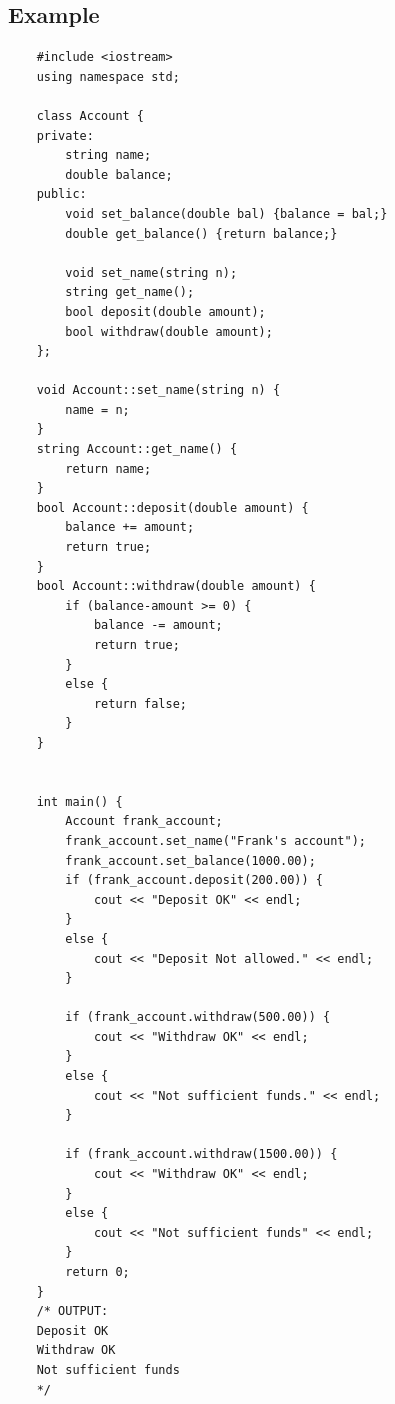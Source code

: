 \subsection{Example}
\begin{verbatim}
    #include <iostream>
    using namespace std;

    class Account {
    private:
        string name;
        double balance;
    public:
        void set_balance(double bal) {balance = bal;}
        double get_balance() {return balance;}

        void set_name(string n);
        string get_name();
        bool deposit(double amount);
        bool withdraw(double amount);
    };

    void Account::set_name(string n) {
        name = n;
    }
    string Account::get_name() {
        return name;
    }
    bool Account::deposit(double amount) {
        balance += amount;
        return true;
    }
    bool Account::withdraw(double amount) {
        if (balance-amount >= 0) {
            balance -= amount;
            return true;
        }
        else {
            return false;
        }
    }


    int main() {
        Account frank_account;
        frank_account.set_name("Frank's account");
        frank_account.set_balance(1000.00);
        if (frank_account.deposit(200.00)) {
            cout << "Deposit OK" << endl;
        }
        else {
            cout << "Deposit Not allowed." << endl;
        }

        if (frank_account.withdraw(500.00)) {
            cout << "Withdraw OK" << endl;
        } 
        else {
            cout << "Not sufficient funds." << endl;
        }

        if (frank_account.withdraw(1500.00)) {
            cout << "Withdraw OK" << endl;
        }
        else {
            cout << "Not sufficient funds" << endl;
        }
        return 0;
    }
    /* OUTPUT:
    Deposit OK
    Withdraw OK
    Not sufficient funds
    */
\end{verbatim}



